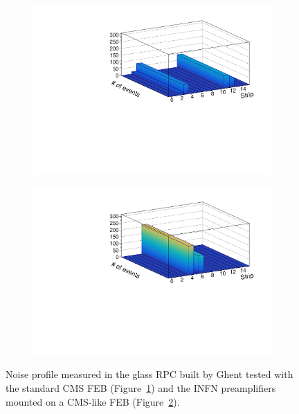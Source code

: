 	\begin{figure}[H]
		\begin{subfigure}{.5\linewidth}
		    \centering
			\includegraphics[width=\linewidth]{fig/chapt6/Noise-Profile-gRPC-CMS-FEB.pdf}
			\caption{\label{fig:gRPC-noise:A}}
		\end{subfigure}
		\begin{subfigure}{.5\linewidth}
		    \centering
			\includegraphics[width = \linewidth]{fig/chapt6/Noise-Profile-gRPC-INFN.pdf}
			\caption{\label{fig:gRPC-noise:B}}
		\end{subfigure}
		\caption{\label{fig:gRPC-noise} Noise profile measured in the glass RPC built by Ghent tested with the standard CMS FEB (Figure~\ref{fig:gRPC-noise:A}) and the INFN preamplifiers mounted on a CMS-like FEB (Figure~\ref{fig:gRPC-noise:B}).}
	\end{figure}
    

